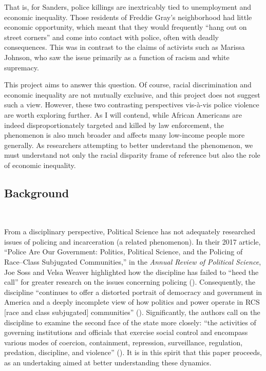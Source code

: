 \documentclass[12pt]{article}
\begin{document}
That is, for Sanders, police killings are inextricably tied to unemployment and economic inequality. Those residents of Freddie Gray's neighborhood had little economic opportunity, which meant that they would frequently “hang out on street corners” and come into contact with police, often with deadly consequences. This was in contrast to the claims of activists such as Marissa Johnson, who saw the issue primarily as a function of racism and white supremacy.

This project aims to answer this question. Of course, racial discrimination and economic inequality are not mutually exclusive, and this project does not suggest such a view. However, these two contrasting perspectives vis-à-vis police violence are worth exploring further. As I will contend, while African Americans are indeed disproportionately targeted and killed by law enforcement, the phenomenon is also much broader and affects many low-income people more generally. As researchers attempting to better understand the phenomenon, we must understand not only the racial disparity frame of reference but also the role of economic inequality.

\subsection{Background}\

From a disciplinary perspective, Political Science has not adequately researched issues of policing and incarceration (a related phenomenon). In their 2017 article, “Police Are Our Government: Politics, Political Science, and the Policing of Race–Class Subjugated Communities,” in the \textit{Annual Review of Political Science}, Joe Soss and Velsa Weaver highlighted how the discipline has failed to “heed the call” for greater research on the issues concerning policing (\citeyear[568]{sossPoliceAreOur2017}). Consequently, the discipline “continues to offer a distorted portrait of democracy and government in America and a deeply incomplete view of how politics and power operate in RCS [race and class subjugated] communities” (\cite[568]{sossPoliceAreOur2017}). Significantly, the authors call on the discipline to examine the second face of the state more closely: ``the activities of governing institutions and officials that exercise social control and encompass various modes of coercion, containment, repression, surveillance, regulation, predation, discipline, and violence” (\cite[567]{sossPoliceAreOur2017}). It is in this spirit that this paper proceeds, as an undertaking aimed at better understanding these dynamics.
\end{document}
